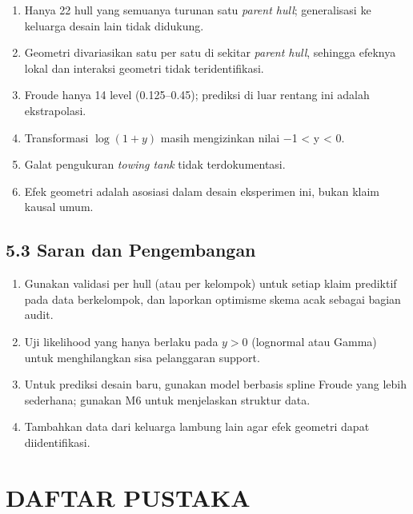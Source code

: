\documentclass[
]{article}
\providecommand{\tightlist}{%
  \setlength{\itemsep}{0pt}\setlength{\parskip}{0pt}}
\begin{document}
\begin{enumerate}
\def\labelenumi{\arabic{enumi}.}
\tightlist
\item
  Hanya 22 hull yang semuanya turunan satu \emph{parent hull};
  generalisasi ke keluarga desain lain tidak didukung.
\item
  Geometri divariasikan satu per satu di sekitar \emph{parent hull},
  sehingga efeknya lokal dan interaksi geometri tidak teridentifikasi.
\item
  Froude hanya 14 level (0.125--0.45); prediksi di luar rentang ini
  adalah ekstrapolasi.
\item
  Transformasi \(\log(1+y)\) masih mengizinkan nilai −1 \textless{} y
  \textless{} 0.
\item
  Galat pengukuran \emph{towing tank} tidak terdokumentasi.
\item
  Efek geometri adalah asosiasi dalam desain eksperimen ini, bukan klaim
  kausal umum.
\end{enumerate}

\subsection{5.3 Saran dan Pengembangan}\label{saran-dan-pengembangan}

\begin{enumerate}
\def\labelenumi{\arabic{enumi}.}
\tightlist
\item
  Gunakan validasi per hull (atau per kelompok) untuk setiap klaim
  prediktif pada data berkelompok, dan laporkan optimisme skema acak
  sebagai bagian audit.
\item
  Uji likelihood yang hanya berlaku pada \(y>0\) (lognormal atau Gamma)
  untuk menghilangkan sisa pelanggaran support.
\item
  Untuk prediksi desain baru, gunakan model berbasis spline Froude yang
  lebih sederhana; gunakan M6 untuk menjelaskan struktur data.
\item
  Tambahkan data dari keluarga lambung lain agar efek geometri dapat
  diidentifikasi.
\end{enumerate}

\newpage

\section{DAFTAR PUSTAKA}\label{daftar-pustaka}
\end{document}
